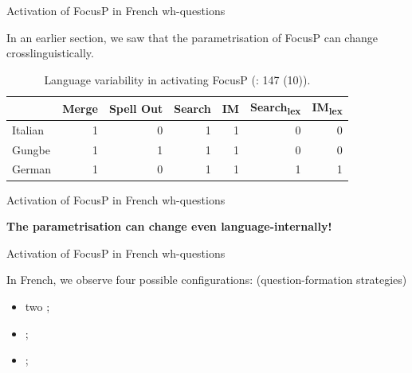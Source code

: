 \documentclass[lesson_slides]{subfiles}
\begin{document}
\begin{frame}[c]{Activation of FocusP in French wh-questions}

    In an earlier section, we saw that the parametrisation of FocusP can change crosslinguistically. \pause

    \begin{table}[H]
    \centering
        \begin{tabular}{|l|r|r|r|r|r|r|}
        \hline
         & Merge & Spell Out & Search & IM & Search\textsubscript{lex} & IM\textsubscript{lex} \\
        \hline
        Italian & 1 & 0 & 1 & 1 & 0 & 0 \\
        \hline
        Gungbe & 1 & 1 & 1 & 1 & 0 & 0 \\
        \hline
        German & 1 & 0 & 1 & 1 & 1 & 1 \\
        \hline
        \end{tabular}
    \caption{\label{tab:samp}Language variability in activating FocusP (\citealt{samo2019cartography}: 147 (10)).}
    \end{table}

\end{frame}
\begin{frame}[c]{Activation of FocusP in French wh-questions}

\begin{center}
    \bf{The parametrisation can change even language-internally!}
\end{center}

\end{frame}
\begin{frame}[c]{Activation of FocusP in French wh-questions}

    In French, we observe four possible configurations: \pause (question-formation strategies) \pause
    \begin{itemize}
        \item[\ding{227}] two ;
        \item[\ding{227}] ;
        \item[\ding{227}] ;
    \end{itemize}

\end{frame}
\end{document}
